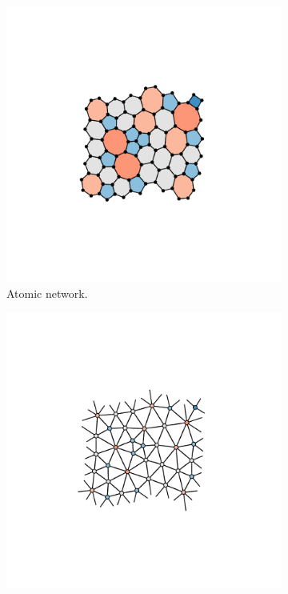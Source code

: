 \begin{figure}[bt]
     \centering
     
     \begin{subfigure}[b]{0.3\textwidth}
         \centering
         \includegraphics[width=\textwidth]{./figures/methods/graph.pdf}
         \caption{Atomic network.}
         \label{fig:graphdualgraph}
     \end{subfigure}
     \hfill
	\begin{subfigure}[b]{0.3\textwidth}
         \centering
         \includegraphics[width=\textwidth]{./figures/methods/dual.pdf}

\end{subfigure}
\end{figure}
